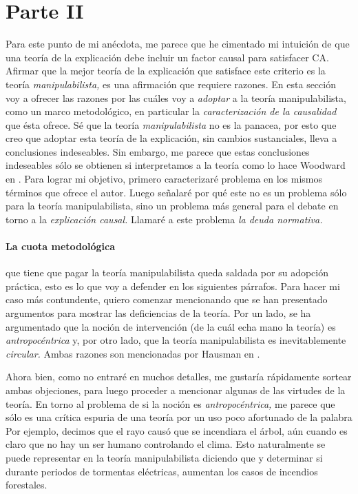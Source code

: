 \section{Parte II}
\label{s:pii}

\noindent Para este punto de mi anécdota, me parece que he
cimentado mi intuición de que una teoría de la explicación
debe incluir un factor causal para satisfacer CA. Afirmar que la mejor teoría de la explicación que satisface este criterio es la teoría \emph{manipulabilista,} es una afirmación que requiere razones. En esta sección voy a ofrecer las razones por las cuáles voy a
\emph{adoptar} a la teoría manipulabilista, como un marco
metodológico, en particular la
\emph{caracterización de la causalidad} que ésta ofrece. Sé
que la teoría \emph{manipulabilista} no es la panacea, por
esto que creo que adoptar esta teoría de la explicación, sin
cambios sustanciales, lleva a conclusiones indeseables. Sin embargo, me parece que estas conclusiones
indeseables sólo se obtienen si interpretamos a la teoría
como lo hace Woodward en \citeyear{caushuman}. Para lograr
mi objetivo, primero caracterizaré  problema en los mismos términos que
ofrece el autor. Luego señalaré por qué este no es un
problema sólo para la teoría manipulabilista, sino un
problema más general para el debate en torno a la
\emph{explicación causal.}
Llamaré a este problema \emph{la deuda normativa.}  

\paragraph{La cuota metodológica} que tiene que pagar la
teoría manipulabilista queda saldada por su adopción
práctica, esto es lo que voy a defender en los siguientes
párrafos. Para hacer mi caso más contundente, quiero
comenzar mencionando que se han presentado argumentos
para mostrar las deficiencias de la teoría. Por un lado, se
ha argumentado que la noción de intervención (de la cuál
echa mano la teoría) es \emph{antropocéntrica} y, por otro
lado, que la teoría manipulabilista es inevitablemente
\emph{circular.} Ambas razones son mencionadas por Hausman
en .	

Ahora bien, como no entraré en muchos detalles, me gustaría
rápidamente sortear ambas objeciones, para luego proceder a
mencionar algunas de las virtudes de la teoría. En torno al
problema de si la noción es \emph{antropocéntrica,} me
parece que sólo es una crítica espuria de una teoría por un
uso poco afortunado de la palabra  Por
ejemplo, decimos que el rayo causó que se incendiara el
árbol, aún cuando es claro que no hay un ser humano
controlando el clima. Esto naturalmente se puede representar
en la teoría manipulabilista diciendo que  y determinar si durante
periodos de tormentas eléctricas, aumentan los casos de
incendios forestales. 

